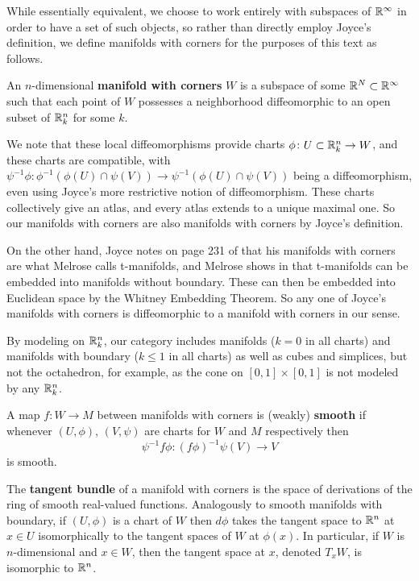While essentially equivalent, we choose to work entirely with subspaces of $\mathbb{R}^\infty$ in order to have a set of such objects, so rather than directly employ Joyce's definition, we define manifolds with corners for the purposes of this text as follows.

\begin{definition}\label{D: MWC}
	An $n$-dimensional \textbf{manifold with corners} $W$ is a subspace of some $\mathbb{R}^N \subset \mathbb{R}^\infty$ such that each point of $W$ possesses a neighborhood diffeomorphic to an open subset of $\mathbb{R}^n_k$ for some $k$.
\end{definition}

We note that these local diffeomorphisms provide charts $\phi \colon U\subset \mathbb{R}^n_k\to W$, and these charts are compatible, with $\psi^{-1}\phi \colon \phi^{-1}(\phi(U)\cap \psi(V))\to \psi^{-1}(\phi(U)\cap \psi(V))$ being a diffeomorphism, even using Joyce's more restrictive notion of diffeomorphism.
These charts collectively give an atlas, and every atlas extends to a unique maximal one.
So our manifolds with corners are also manifolds with corners by Joyce's definition.

On the other hand, Joyce notes on page 231 of \cite{Joy12} that his manifolds with corners are what Melrose calls t-manifolds, and Melrose shows in \cite[Proposition 1.15.1]{Melrose} that t-manifolds can be embedded into manifolds without boundary.
These can then be embedded into Euclidean space by the Whitney Embedding Theorem.
So any one of Joyce's manifolds with corners is diffeomorphic to a manifold with corners in our sense.

By modeling on $\mathbb{R}^n_k$, our category includes manifolds ($k=0$ in all charts) and manifolds with boundary ($k\leq 1$ in all charts) as well as cubes and simplices, but not the octahedron, for example, as the cone on $[0,1]\times [0,1]$ is not modeled by any $\mathbb{R}^n_k$.

\begin{definition}
	A map $f \colon W\to M$ between manifolds with corners is {(weakly) \bf smooth} if whenever $(U,\phi)$, $(V,\psi)$ are charts for $W$ and $M$ respectively then
	$$\psi^{-1}f \phi \colon (f\phi)^{-1}\psi(V)\to V$$
	is smooth.

	The \textbf{tangent bundle} of a manifold with corners is the space of derivations of the ring of smooth real-valued functions.
	Analogously to smooth manifolds with boundary, if $(U,\phi)$ is a chart of $W$ then $d\phi$ takes the tangent space to $\mathbb{R}^n$ at $x\in U$ isomorphically to the tangent spaces of $W$ at $\phi(x)$.
	In particular, if $W$ is $n$-dimensional and $x\in W$, then the tangent space at $x$, denoted $T_xW$, is isomorphic to $\mathbb{R}^n$.
\end{definition}

